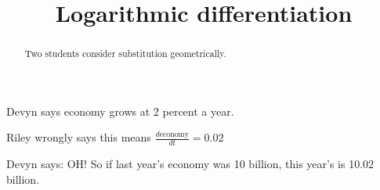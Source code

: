 \documentclass{ximera}
\title[Break-Ground:]{Logarithmic differentiation}
\begin{document}
\begin{abstract}
Two students consider substitution geometrically.
\end{abstract}
\maketitle

Devyn says economy grows at 2 percent a year.

Riley wrongly says this means $\frac{d\mbox{economy}}{dt} = 0.02$

Devyn says: OH!  So if last year's economy was 10 billion, this year's is 10.02 billion.







\end{document}
